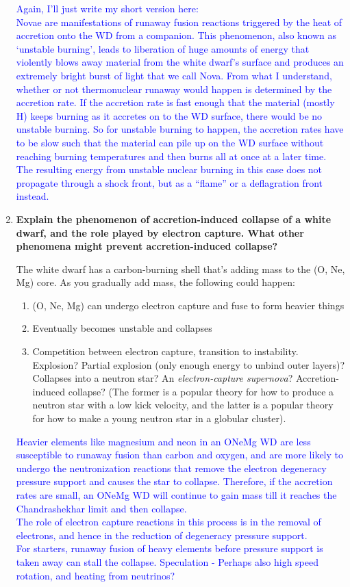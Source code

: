 \documentclass[a4paper]{article}
\begin{document}
\begin{enumerate}
\textcolor{blue}{Again, I'll just write my short version here:\\ Novae are manifestations of runaway fusion reactions triggered by the heat of accretion onto the WD from a companion. This phenomenon, also known as `unstable burning', leads to liberation of huge amounts of energy that violently blows away material from the white dwarf's surface and produces an extremely bright burst of light that we call Nova. From what I understand, whether or not thermonuclear runaway would happen is determined by the accretion rate. If the accretion rate is fast enough that the material (mostly H) keeps burning as it accretes on to the WD surface, there would be no unstable burning. So for unstable burning to happen, the accretion rates have to be slow such that the material can pile up on the WD surface without reaching burning temperatures and then burns all at once at a later time. The resulting energy from unstable nuclear burning in this case does not propagate through a shock front, but as a ``flame'' or a deflagration front instead.}

\item \textbf{Explain the phenomenon of accretion-induced collapse of a white dwarf, and the role played by electron capture. What other phenomena might prevent accretion-induced collapse?}

The white dwarf has a carbon-burning shell that's adding mass to the (O, Ne, Mg) core. As you gradually add mass, the following could happen:

\begin{enumerate}
\item (O, Ne, Mg) can undergo electron capture and fuse to form heavier things
\item Eventually becomes unstable and collapses
\item Competition between electron capture, transition to instability. Explosion? Partial explosion (only enough energy to unbind outer layers)? Collapses into a neutron star? An \emph{electron-capture supernova}? Accretion-induced collapse? (The former is a popular theory for how to produce a neutron star with a low kick velocity, and the latter is a popular theory for how to make a young neutron star in a globular cluster). 
\end{enumerate}

\textcolor{blue}{Heavier elements like magnesium and neon in an ONeMg WD are less susceptible to runaway fusion than carbon and oxygen, and are more likely to undergo the neutronization reactions that remove the electron degeneracy pressure support and causes the star to collapse. Therefore, if the accretion rates are small, an ONeMg WD will continue to gain mass till it reaches the Chandrashekhar limit and then collapse.\\ The role of electron capture reactions in this process is in the removal of electrons, and hence in the reduction of degeneracy pressure support.\\ For starters, runaway fusion of heavy elements before pressure support is taken away can stall the collapse. Speculation - Perhaps also high speed rotation, and heating from neutrinos?}


\end{enumerate}
\end{document}
